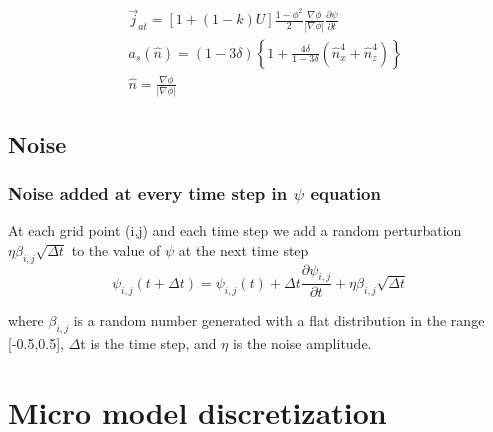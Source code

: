 \documentclass[a4paper,12pt]{article}
\begin{document}
\begin{align}
	& \vec{j}_{at} =  [1+(1-k)U]\frac{1-\phi^{2}}{{2}}  \frac{\nabla \phi}{|\nabla \phi|} \frac{\partial \psi}{\partial t} \\
	& a_{s}(\hat{n}) = (1-3\delta)\left\{1+\frac{4 \delta}{1-3\delta}(\hat{n}_x^4 + \hat{n}_z^4) \right\} \\
        & \hat{n} =  \frac{\nabla \phi}{|\nabla \phi|} 
\end{align}



\subsection{Noise}

\subsubsection{Noise added at every time step in $\psi$ equation}
At each grid point (i,j) and each time step we add a random perturbation $\eta\beta_{i,j}\sqrt{\Delta t}$ to the value of $\psi$ at the next time step \cite{Tourret2015}
\begin{equation}
\psi_{i, j}(t+\Delta t)=\psi_{i, j}(t)+\Delta t \frac{\partial \psi_{i, j}}{\partial t}+\eta \beta_{i, j} \sqrt{\Delta t}
\end{equation}

where $\beta_{i,j}$ is a random number generated with a flat distribution in the range [-0.5,0.5], $\Delta$t is the time step, and $\eta$ is the noise amplitude.


\section{Micro model discretization}
\end{document}
